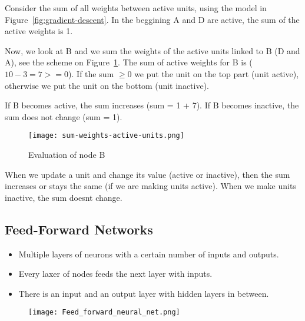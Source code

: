 \documentclass[main]{subfiles}
\begin{document}
Consider the sum of all weights between active units, using the model in Figure~\ref{fig:gradient-descent}. In the beggining A and D are active, the sum of the active weights is 1.

Now, we look at B and we sum the weights of the active units linked to B (D and A), see the scheme on Figure~\ref{fig:sum-weights}. The sum of active weights for B is ($10 - 3 = 7 >= 0$). If the sum $\geq 0$ we put the unit on the top part (unit active), otherwise we put the unit on the bottom (unit inactive).

If B becomes active, the sum increases (sum = 1 + 7). If B becomes inactive, the sum does not change (sum = 1).

\begin{figure}[H]
	\centering
	\texttt{[image: sum-weights-active-units.png]}
	\label{fig:sum-weights}
	\caption{Evaluation of node B}
\end{figure}

When we update a unit and change its value (active or inactive), then the sum increases or stays the same (if we are making units active). When we make units inactive, the sum doesnt change.

\subsection{Feed-Forward Networks}
\begin{itemize}[noitemsep,nolistsep]
	\item Multiple layers of neurons with a certain number of inputs and outputs.
	\item Every laxer of nodes feeds the next layer with inputs.
	\item There is an input and an output layer with hidden layers in between.
\end{itemize}
\begin{figure}[H]
	\centering
	\texttt{[image: Feed\_forward\_neural\_net.png]}
\end{figure}
\end{document}
